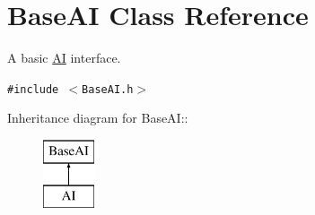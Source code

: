 \hypertarget{classBaseAI}{
\section{BaseAI Class Reference}
\label{classBaseAI}
}
A basic \hyperlink{classAI}{AI} interface.  


{\tt \#include $<$BaseAI.h$>$}

Inheritance diagram for BaseAI::\begin{figure}[H]
\begin{center}
\leavevmode
\includegraphics[height=2cm]{classBaseAI}
\end{center}
\end{figure}

